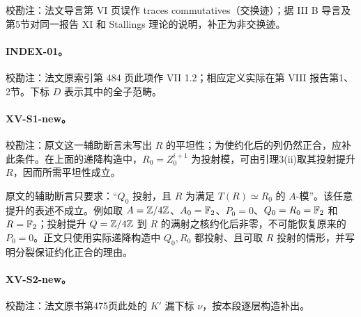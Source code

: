 校勘注：法文导言第 VI 页误作 traces commutatives（交换迹）；据 III B 导言及第5节对同一报告 XI 和 Stallings 理论的说明，补正为非交换迹。

\hypertarget{collation-INDEX-01}{}

\paragraph*{INDEX-01。}

校勘注：法文原索引第 484 页此项作 VII 1.2；相应定义实际在第 VIII 报告第1、2节。下标 $D$ 表示其中的全子范畴。

\hypertarget{collation-XV-S1-new}{}

\paragraph*{XV-S1-new。}

校勘注：原文这一辅助断言未写出 $R$ 的平坦性；为使约化后的列仍然正合，应补此条件。在上面的递降构造中，$R_0=Z_0^{i+1}$ 为投射模，可由引理3(ii)取其投射提升 $R$，因而所需平坦性成立。

原文的辅助断言只要求：“$Q_0$ 投射，且 $R$ 为满足 $T(R)\simeq R_0$ 的 $A$-模”。该任意提升的表述不成立。例如取 $A=\mathbb Z/4\mathbb Z$、$A_0=\mathbb{F}_2$、$P_0=0$、$Q_0=R_0=\mathbb{F}_2$ 和 $R=\mathbb{F}_2$；投射提升 $Q=\mathbb Z/4\mathbb Z$ 到 $R$ 的满射之核约化后非零，不可能恢复原来的 $P_0=0$。正文只使用实际递降构造中 $Q_0,R_0$ 都投射、且可取 $R$ 投射的情形，并写明分裂保证约化正合的理由。

\hypertarget{collation-XV-S2-new}{}

\paragraph*{XV-S2-new。}

校勘注：法文原书第475页此处的 $K\prime$ 漏下标 $\nu$，按本段逐层构造补出。
